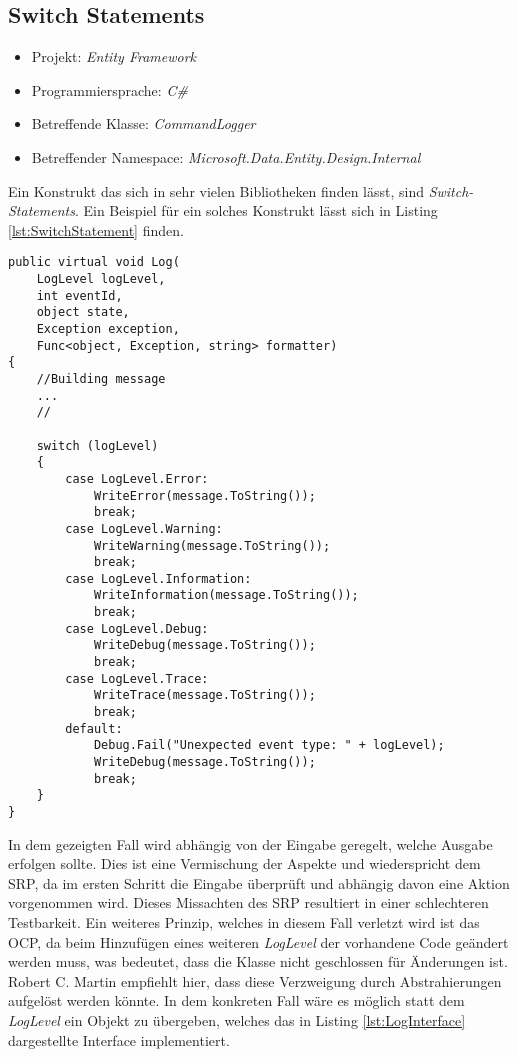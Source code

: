 \subsection{Switch Statements}
\begin{itemize}
	\item Projekt: \textit{Entity Framework}
	\item Programmiersprache: \textit{C\#}
	\item Betreffende Klasse: \textit{CommandLogger }
	\item Betreffender Namespace: \textit{Microsoft.Data.Entity.Design.Internal}
\end{itemize}
\SuperPar Ein Konstrukt das sich in sehr vielen Bibliotheken finden lässt, sind \textit{Switch-Statements}. Ein Beispiel für ein solches Konstrukt lässt sich in  Listing \ref{lst:SwitchStatement} finden.

\begin{lstlisting}[language={[Sharp]C}, caption=Beispiele für Switch Statement, label=lst:SwitchStatement]
public virtual void Log(
	LogLevel logLevel,
	int eventId,
	object state,
	Exception exception,
	Func<object, Exception, string> formatter)
{
	//Building message
	...
	//

	switch (logLevel)
	{
		case LogLevel.Error:
			WriteError(message.ToString());
			break;
		case LogLevel.Warning:
			WriteWarning(message.ToString());
			break;
		case LogLevel.Information:
			WriteInformation(message.ToString());
			break;
		case LogLevel.Debug:
			WriteDebug(message.ToString());
			break;
		case LogLevel.Trace:
			WriteTrace(message.ToString());
			break;
		default:
			Debug.Fail("Unexpected event type: " + logLevel);
			WriteDebug(message.ToString());
			break;
	}
}
\end{lstlisting}

\SuperPar In dem gezeigten Fall wird abhängig von der Eingabe geregelt, welche Ausgabe erfolgen sollte. Dies ist eine Vermischung der Aspekte und wiederspricht dem SRP, da im ersten Schritt die Eingabe überprüft und abhängig davon eine Aktion vorgenommen wird. Dieses Missachten des SRP resultiert in einer schlechteren Testbarkeit. Ein weiteres Prinzip, welches in diesem Fall verletzt wird ist das OCP, da beim Hinzufügen eines weiteren \textit{LogLevel} der vorhandene Code geändert werden muss, was bedeutet, dass die Klasse nicht geschlossen für Änderungen ist. Robert C. Martin empfiehlt hier, dass diese Verzweigung durch Abstrahierungen aufgelöst werden könnte. In dem konkreten Fall wäre es möglich statt dem \textit{LogLevel} ein Objekt zu übergeben, welches das in Listing \ref{lst:LogInterface} dargestellte Interface implementiert.

